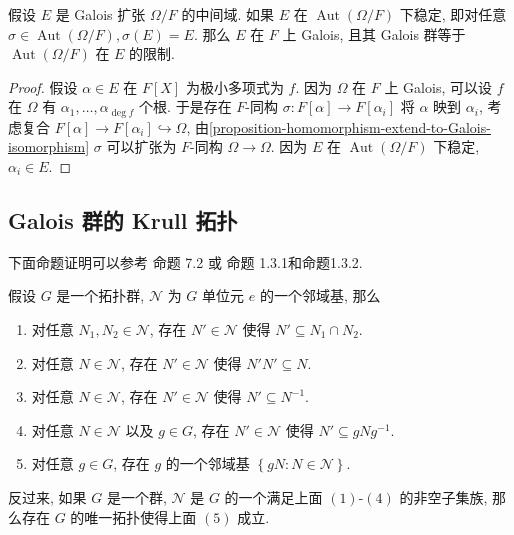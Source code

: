 \begin{corollary}
  \label{corollary-Galois-extension-stable-middle-field-Galois}
  假设 \( E \) 是 Galois 扩张 \( \Omega / F \) 的中间域.
  如果 \( E \) 在 \( \operatorname{Aut}(\Omega/F) \) 下稳定, 即对任意 \( \sigma
  \in \operatorname{Aut}(\Omega/F), \sigma(E) = E \).
  那么 \( E \) 在 \( F \) 上 Galois, 且其 Galois 群等于 \(
  \operatorname{Aut}(\Omega/F) \) 在 \( E \) 的限制.
\end{corollary}
\begin{proof}
  假设 \( \alpha \in E \) 在 \( F[X] \) 为极小多项式为 \( f \).
  因为 \( \Omega \) 在 \( F \) 上 Galois, 可以设 \( f \) 在 \( \Omega \) 有 \(
  \alpha_1, \ldots, \alpha_{\deg f} \) 个根.
  于是存在 \( F \)-同构 \( \sigma: F[\alpha] \to F[\alpha_i] \) 将 \( \alpha \)
  映到 \( \alpha_i \), 考虑复合 \( F[\alpha] \to F[\alpha_i] \hookrightarrow
  \Omega \), 由\cref{proposition-homomorphism-extend-to-Galois-isomorphism} \(
  \sigma \) 可以扩张为 \( F \)-同构 \( \Omega \to \Omega \). 因为 \( E \) 在 \(
  \operatorname{Aut}(\Omega/F) \) 下稳定, \( \alpha_i \in E \).
\end{proof}

\subsection{Galois 群的 Krull 拓扑}

下面命题证明可以参考\cite{milne_fields_2022} 命题 7.2 或\cite{2014-zv} 命题
1.3.1和命题1.3.2.

\begin{proposition}
  \label{proposition-topological-group-iff-condition}
  假设 \( G \) 是一个拓扑群, \( \mathcal{N} \) 为 \( G \) 单位元 \( e \)
  的一个邻域基, 那么
  \begin{enumerate}
    \item 对任意 \( N_1, N_2 \in \mathcal{N} \), 存在 \( N' \in \mathcal{N} \)
      使得 \( N' \subseteq N_1 \cap N_2 \).
    \item 对任意 \( N \in \mathcal{N} \), 存在 \( N' \in \mathcal{N} \) 使得 \(
      N' N' \subseteq N \).
    \item 对任意 \( N \in \mathcal{N} \), 存在 \( N' \in \mathcal{N} \) 使得 \(
      N' \subseteq N^{-1} \).
    \item 对任意 \( N \in \mathcal{N} \) 以及 \( g \in G \), 存在 \( N' \in
      \mathcal{N} \) 使得 \( N' \subseteq g N g^{-1} \).
    \item 对任意 \( g \in G \), 存在 \( g \) 的一个邻域基 \( \left\lbrace g N :
      N \in \mathcal{N} \right\rbrace \).
  \end{enumerate}
  反过来, 如果 \( G \) 是一个群, \( \mathcal{N} \) 是 \( G \) 的一个满足上面 \(
  (1)\text{-}(4) \) 的非空子集族, 那么存在 \( G \) 的唯一拓扑使得上面 \( (5) \)
  成立.
\end{proposition}

